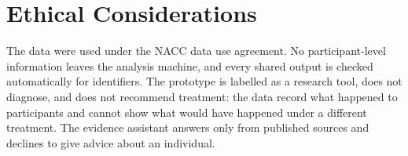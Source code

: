 \section{Ethical Considerations}

The data were used under the NACC data use agreement. No participant-level information leaves the analysis machine, and every shared output is checked automatically for identifiers. The prototype is labelled as a research tool, does not diagnose, and does not recommend treatment: the data record what happened to participants and cannot show what would have happened under a different treatment. The evidence assistant answers only from published sources and declines to give advice about an individual.
